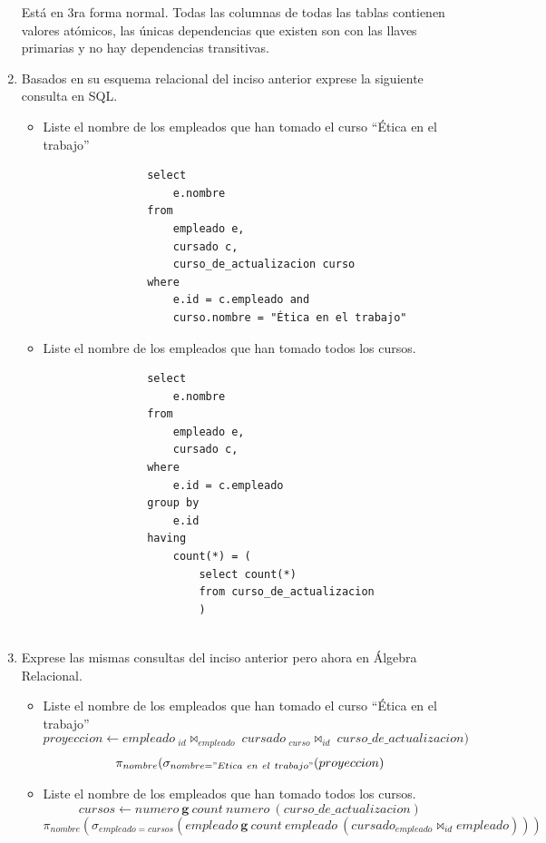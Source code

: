 \documentclass[]{article}
\begin{document}
\begin{enumerate}
        Está en 3ra forma normal. Todas las columnas de todas las tablas contienen valores atómicos, las únicas dependencias
        que existen son con las llaves primarias y no hay dependencias transitivas.

        \item Basados en su esquema relacional del inciso anterior exprese la siguiente consulta en SQL.
        \begin{itemize}
            \item Liste el nombre de los empleados que han tomado el curso “Ética en el trabajo”
            \begin{lstlisting}
                select 
                    e.nombre 
                from 
                    empleado e,
                    cursado c,
                    curso_de_actualizacion curso
                where 
                    e.id = c.empleado and 
                    curso.nombre = "Ética en el trabajo"
            \end{lstlisting}
            \item Liste el nombre de los empleados que han tomado todos los cursos.
            \begin{lstlisting}    
                select 
                    e.nombre 
                from 
                    empleado e,
                    cursado c,
                where 
                    e.id = c.empleado
                group by
                    e.id
                having
                    count(*) = (
                        select count(*)
                        from curso_de_actualizacion
                        )
            
                \end{lstlisting}
        \end{itemize}
        \item Exprese las mismas consultas del inciso anterior pero ahora en Álgebra Relacional.
        
        \begin{itemize}
            \item Liste el nombre de los empleados que han tomado el curso “Ética en el trabajo”
            $$proyeccion \leftarrow empleado\ _{id}\bowtie_{empleado}\ cursado\ _{curso}\bowtie_{id}\ curso\_de\_actualizacion)$$
            $$\pi_{nombre}(\sigma_{nombre = "Etica\ en\ el\ trabajo"}(proyeccion)$$
            \item Liste el nombre de los empleados que han tomado todos los cursos.
            $$cursos \leftarrow numero\ \textbf{g}\ count\ numero\ (curso\_de\_actualizacion)$$
            $$\pi_{nombre}(\sigma_{empleado = cursos}(empleado\ \textbf{g}\ count\ empleado\ (cursado _{empleado}\bowtie_{id} empleado)))$$
        \end{itemize}
        
    \end{enumerate}
    

 
\end{document}
